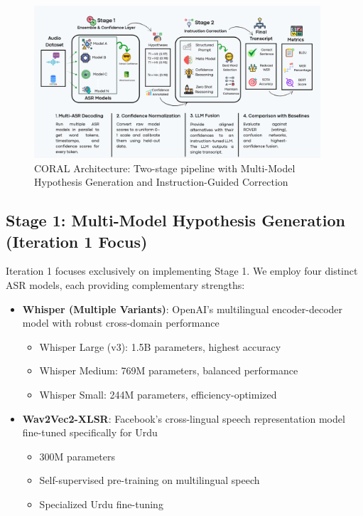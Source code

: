 \begin{figure}[htbp]
    \centering
    \includegraphics[width=0.95\textwidth]{ThesisFigs/coral-white.png}
    \caption{CORAL Architecture: Two-stage pipeline with Multi-Model Hypothesis Generation and Instruction-Guided Correction}
    \label{fig:coral_architecture}
\end{figure}

\subsection{Stage 1: Multi-Model Hypothesis Generation (Iteration 1 Focus)}

Iteration 1 focuses exclusively on implementing Stage 1. We employ four distinct ASR models, each providing complementary strengths:

\begin{itemize}
    \item \textbf{Whisper (Multiple Variants)}: OpenAI's multilingual encoder-decoder model with robust cross-domain performance
    \begin{itemize}
        \item Whisper Large (v3): 1.5B parameters, highest accuracy
        \item Whisper Medium: 769M parameters, balanced performance
        \item Whisper Small: 244M parameters, efficiency-optimized
    \end{itemize}
    
    \item \textbf{Wav2Vec2-XLSR}: Facebook's cross-lingual speech representation model fine-tuned specifically for Urdu
    \begin{itemize}
        \item 300M parameters
        \item Self-supervised pre-training on multilingual speech
        \item Specialized Urdu fine-tuning
    \end{itemize}
\end{itemize}


